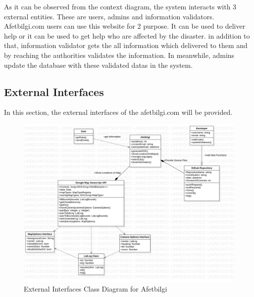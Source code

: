 As it can be observed from the context diagram, the system interacts with 3 external entities. These are users, admins and information validators. Afetbilgi.com users can use this website for 2 purpose. It can be used to deliver help or it can be used to get help who are affected by the disaster.
in addition to that, information validator gets the all information which delivered to them and by reaching the authorities validates the information. In meanwhile, admins update the database with these validated datas in the system. 

\subsection{External Interfaces}

In this section, the external interfaces of the afetbilgi.com will be provided.

\begin{figure}[H]
    \includegraphics[scale = 0.4]{assets/externalInterfaces.png}
    \caption[External Interfaces Class Diagram for Afetbilgi]{External Interfaces Class Diagram for Afetbilgi}
\end{figure}

